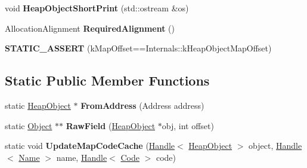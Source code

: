 \begin{DoxyCompactItemize}
\item 
void {\bfseries Heap\+Object\+Short\+Print} (std\+::ostream \&os)\hypertarget{classv8_1_1internal_1_1_heap_object_ad2ac162b5f328c698255e2b0dd60a5d9}{}\label{classv8_1_1internal_1_1_heap_object_ad2ac162b5f328c698255e2b0dd60a5d9}

\item 
Allocation\+Alignment {\bfseries Required\+Alignment} ()\hypertarget{classv8_1_1internal_1_1_heap_object_ab3b407b1327cca15d25de440a097e048}{}\label{classv8_1_1internal_1_1_heap_object_ab3b407b1327cca15d25de440a097e048}

\item 
{\bfseries S\+T\+A\+T\+I\+C\+\_\+\+A\+S\+S\+E\+RT} (k\+Map\+Offset==Internals\+::k\+Heap\+Object\+Map\+Offset)\hypertarget{classv8_1_1internal_1_1_heap_object_a1131daa4da3892fce29f1292aabafab3}{}\label{classv8_1_1internal_1_1_heap_object_a1131daa4da3892fce29f1292aabafab3}

\end{DoxyCompactItemize}
\subsection*{Static Public Member Functions}
\begin{DoxyCompactItemize}
\item 
static \hyperlink{classv8_1_1internal_1_1_heap_object}{Heap\+Object} $\ast$ {\bfseries From\+Address} (Address address)\hypertarget{classv8_1_1internal_1_1_heap_object_ad0f8ad242fc277a0ad804d539e1c1f7f}{}\label{classv8_1_1internal_1_1_heap_object_ad0f8ad242fc277a0ad804d539e1c1f7f}

\item 
static \hyperlink{classv8_1_1internal_1_1_object}{Object} $\ast$$\ast$ {\bfseries Raw\+Field} (\hyperlink{classv8_1_1internal_1_1_heap_object}{Heap\+Object} $\ast$obj, int offset)\hypertarget{classv8_1_1internal_1_1_heap_object_a41c3097b9cbd73e61cb1de6dd633f12c}{}\label{classv8_1_1internal_1_1_heap_object_a41c3097b9cbd73e61cb1de6dd633f12c}

\item 
static void {\bfseries Update\+Map\+Code\+Cache} (\hyperlink{classv8_1_1internal_1_1_handle}{Handle}$<$ \hyperlink{classv8_1_1internal_1_1_heap_object}{Heap\+Object} $>$ object, \hyperlink{classv8_1_1internal_1_1_handle}{Handle}$<$ \hyperlink{classv8_1_1internal_1_1_name}{Name} $>$ name, \hyperlink{classv8_1_1internal_1_1_handle}{Handle}$<$ \hyperlink{classv8_1_1internal_1_1_code}{Code} $>$ code)\hypertarget{classv8_1_1internal_1_1_heap_object_a811b269cf8b6a455b2717c6e50062c70}{}\label{classv8_1_1internal_1_1_heap_object_a811b269cf8b6a455b2717c6e50062c70}

\end{DoxyCompactItemize}

